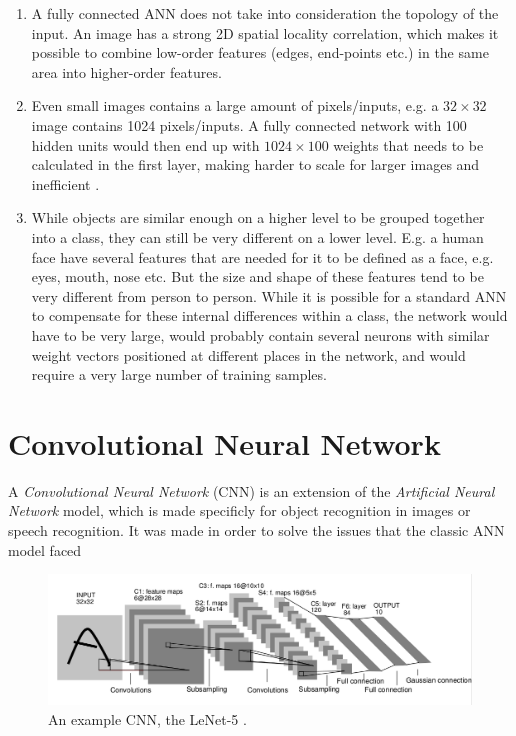\begin{enumerate}

	\item A fully connected ANN does not take into consideration the topology of the input. An image has a strong 2D spatial locality correlation, which makes it possible to combine low-order features (edges, end-points etc.) in the same area into higher-order features.  
	
	\item Even small images contains a large amount of pixels/inputs, e.g. a $ 32 \times 32 $ image contains 1024 pixels/inputs. A fully connected network with 100 hidden units would then end up with $ 1024 \times 100 $ weights that needs to be calculated in the first layer, making harder to scale for larger images and inefficient .
	
	\item While objects are similar enough on a higher level to be grouped together into a class, they can still be very different on a lower level. E.g. a human face have several features that are needed for it to be defined as a face, e.g. eyes, mouth, nose etc. But the size and shape of these features tend to be very different from person to person. While it is possible for a standard ANN to compensate for these internal differences within a class, the network would have to be very large, would probably contain several neurons with similar weight vectors positioned at different places in the network, and would require a very large number of training samples. 
	
\end{enumerate}



\section{Convolutional Neural Network}\label{cnn}

A \textit{Convolutional Neural Network} \cite{LeCun1998} (CNN) is an extension of the \textit{Artificial Neural Network} model, which is made specificly for object recognition in images or speech recognition. It was made in order to solve the issues that the classic ANN model faced 


\begin{figure}[h!]
  \centering
      \includegraphics[width=1.0\textwidth]{Figures/Background/convnet}
  \caption{An example CNN, the LeNet-5 \cite{LeCun1998}. }
  \label{fig_cnn}
\end{figure}

